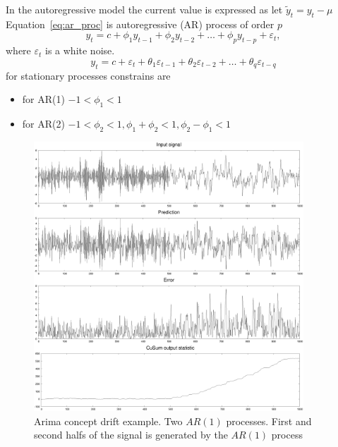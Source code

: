 In the autoregressive model
the current value is expressed as 
let $\tilde{y}_t = y_t - \mu$
Equation~\ref{eq:ar_proc} is autoregressive (AR) process of order $p$
\begin{equation}\label{eq:ar_proc}
  y_{t} = c + \phi_{1}y_{t-1} + \phi_{2}y_{t-2} + \dots + \phi_{p}y_{t-p} + \varepsilon_{t},
\end{equation}
where $\varepsilon_{t}$ is a white noise. 
\begin{equation}\label{eq:ma_proc}
  y_{t} = c + \varepsilon_t + \theta_{1}\varepsilon_{t-1} + \theta_{2}\varepsilon_{t-2} + \dots + \theta_{q}\varepsilon_{t-q}
\end{equation}
for stationary processes constrains are~\cite{hyndman2018forecasting} 
\begin{itemize}
  \item for AR(1) $-1 < \phi_1 < 1$
  \item for AR(2) $-1 < \phi_2 < 1, \phi_1+\phi_2 <1, \phi_2-\phi_1 < 1$
\end{itemize}
\begin{figure}[!htb]
	\centering
	\includegraphics[width=0.9\textwidth]{images/arima_cd_example}
	\caption{Arima concept drift example.
		Two $AR(1) $ processes.
		First and second halfs of the signal is generated by the $AR(1)$ process
	}\label{fig:arima_cd_example}
\end{figure}


